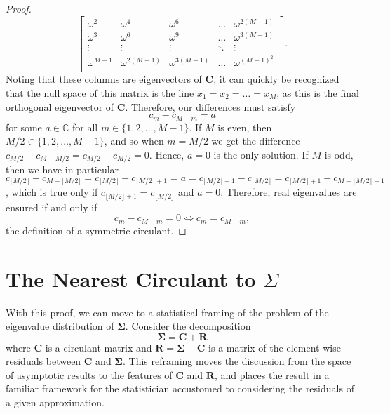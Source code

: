 \documentclass[letterpaper,12pt,oneside,final]{article}
\newcommand{\m}[1]{\mathbf{#1}}               %
\newcommand{\sm}[1]{\boldsymbol{#1}}   %
\newcommand{\field}[1]{\mathbb{#1}}
\newcommand{\Complex}{\field{C}}
\begin{document}
\begin{proof}
$$\begin{bmatrix}
  \omega^2 & \omega^4 & \omega^6 & \dots & \omega^{2(M-1)} \\
  \omega^3 & \omega^6 & \omega^9 & \dots & \omega^{3(M-1)} \\
  \vdots & \vdots & \vdots & \ddots & \vdots \\
  \omega^{M-1} & \omega^{2(M-1)} & \omega^{3(M-1)} & \dots & \omega^{(M-1)^2} \\
  \end{bmatrix}.$$
  Noting that these columns are eigenvectors of $\m{C}$, it can quickly be recognized that the null space of this matrix is the line $x_1 = x_2 = \dots = x_M$, as this is the final orthogonal eigenvector of $\m{C}$. Therefore, our differences must satisfy
  $$c_m - c_{M-m} = a$$
  for some $a \in \Complex$ for all $m \in \{1, 2, \dots, M-1\}$. If $M$ is even, then $M/2 \in \{1, 2, \dots, M-1\}$, and so when $m = M/2$ we get the difference $c_{M/2} - c_{M - M/2} = c_{M/2} - c_{M/2} = 0$. Hence, $a = 0$ is the only solution. If $M$ is odd, then we have in particular $c_{\lfloor M/2 \rfloor} - c_{M - \lfloor M/2 \rfloor} = c_{\lfloor M/2 \rfloor} - c_{\lfloor M/2 \rfloor + 1} = a = c_{\lfloor M/2 \rfloor + 1} - c_{\lfloor M/2 \rfloor} = c_{\lfloor M/2 \rfloor + 1} - c_{M - \lfloor M/2 \rfloor - 1}$, which is true only if $c_{\lfloor M/2 \rfloor + 1} = c_{\lfloor M/2 \rfloor}$ and $a = 0$. Therefore, real eigenvalues are ensured if and only if
  $$c_m - c_{M-m} = 0 \iff c_m = c_{M-m},$$
  the definition of a symmetric circulant.
\end{proof}

\section{The Nearest Circulant to $\Sigma$} \label{c:multipleTesting:nearestCirc}

With this proof, we can move to a statistical framing of the problem of the eigenvalue distribution of $\sm{\Sigma}$. Consider the decomposition
\begin{equation} \label{eq:circDecomp}
  \sm{\Sigma} = \m{C} + \m{R}
\end{equation}
where $\m{C}$ is a circulant matrix and $\m{R} = \sm{\Sigma} - \m{C}$ is a matrix of the element-wise residuals between $\m{C}$ and $\sm{\Sigma}$. This reframing moves the discussion from the space of asymptotic results to the features of $\m{C}$ and $\m{R}$, and places the result in a familiar framework for the statistician accustomed to considering the residuals of a given approximation.
\end{document}
